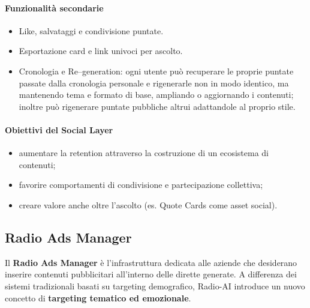 \documentclass[11pt,a4paper]{article}
\begin{document}
\paragraph{Funzionalità secondarie}
\begin{itemize}
    \item Like, salvataggi e condivisione puntate.
    \item Esportazione card e link univoci per ascolto.
    \item Cronologia e Re–generation: ogni utente può recuperare le proprie puntate passate dalla cronologia personale e rigenerarle non in modo identico, ma mantenendo tema e formato di base, ampliando o aggiornando i contenuti; inoltre può rigenerare puntate pubbliche altrui adattandole al proprio stile.
\end{itemize}

\paragraph{Obiettivi del Social Layer}
\begin{itemize}
    \item aumentare la retention attraverso la costruzione di un ecosistema di contenuti;
    \item favorire comportamenti di condivisione e partecipazione collettiva;
    \item creare valore anche oltre l’ascolto (es. Quote Cards come asset social).
\end{itemize}


\subsection{Radio Ads Manager}

Il \textbf{Radio Ads Manager} è l’infrastruttura dedicata alle aziende che desiderano inserire contenuti pubblicitari all’interno delle dirette generate.  
A differenza dei sistemi tradizionali basati su targeting demografico, Radio-AI introduce un nuovo concetto di \textbf{targeting tematico ed emozionale}.
\end{document}
